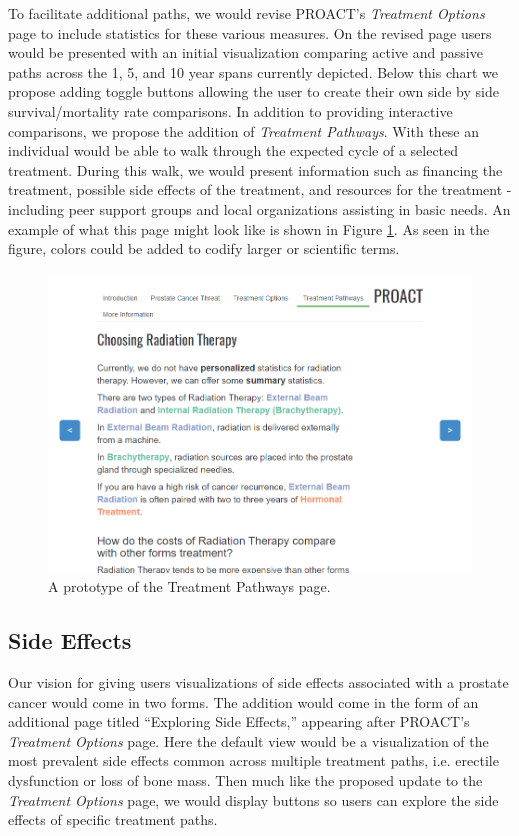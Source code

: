 \documentclass[journal]{vgtc}                %
\begin{document}
                To facilitate additional paths, we would revise PROACT's \textit{Treatment Options} page to include statistics for these various measures.
                On the revised page users would be presented with an initial visualization comparing active and passive paths across the 1, 5, and 10 year spans currently depicted.
                Below this chart we propose adding toggle buttons allowing the user to create their own side by side survival/mortality rate comparisons.
                In addition to providing interactive comparisons, we propose the addition of \textit{Treatment Pathways}.
                With these an individual would be able to walk through the expected cycle of a selected treatment.
                During this walk, we would present information such as financing the treatment, possible side effects of the treatment, and resources for the treatment - including peer support groups and local organizations assisting in basic needs.
                An example of what this page might look like is shown in Figure \ref{fig:path}. As seen in the figure, colors could be added to codify larger or scientific terms.
                \begin{figure}[!ht]
                    \includegraphics[width=\columnwidth]{pathway.png}
                    \caption{A prototype of the Treatment Pathways page.}
                    \label{fig:path}
                \end{figure}


        \subsection{Side Effects}
                Our vision for giving users visualizations of side effects associated with a prostate cancer would come in two forms.
                The addition would come in the form of an additional page titled ``Exploring Side Effects,'' appearing after PROACT's \textit{Treatment Options} page.
                Here the default view would be a visualization of the most prevalent side effects common across multiple treatment paths, i.e. erectile dysfunction or loss of bone mass.
                Then much like the proposed update to the \textit{Treatment Options} page, we would display buttons so users can explore the side effects of specific treatment paths.
\end{document}
